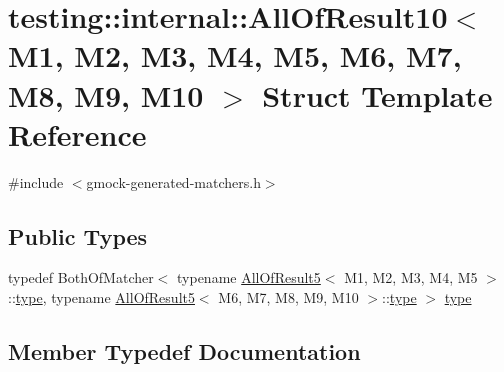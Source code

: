 \hypertarget{structtesting_1_1internal_1_1AllOfResult10}{}\section{testing\+::internal\+::All\+Of\+Result10$<$ M1, M2, M3, M4, M5, M6, M7, M8, M9, M10 $>$ Struct Template Reference}
\label{structtesting_1_1internal_1_1AllOfResult10}


{\ttfamily \#include $<$gmock-\/generated-\/matchers.\+h$>$}

\subsection*{Public Types}
\begin{DoxyCompactItemize}
\item 
typedef Both\+Of\+Matcher$<$ typename \mbox{\hyperlink{structtesting_1_1internal_1_1AllOfResult5}{All\+Of\+Result5}}$<$ M1, M2, M3, M4, M5 $>$\+::\mbox{\hyperlink{structtesting_1_1internal_1_1AllOfResult10_a48d6c6de6d0d5445b212119e1f536af5}{type}}, typename \mbox{\hyperlink{structtesting_1_1internal_1_1AllOfResult5}{All\+Of\+Result5}}$<$ M6, M7, M8, M9, M10 $>$\+::\mbox{\hyperlink{structtesting_1_1internal_1_1AllOfResult10_a48d6c6de6d0d5445b212119e1f536af5}{type}} $>$ \mbox{\hyperlink{structtesting_1_1internal_1_1AllOfResult10_a48d6c6de6d0d5445b212119e1f536af5}{type}}
\end{DoxyCompactItemize}


\subsection{Member Typedef Documentation}
\mbox{\label{structtesting_1_1internal_1_1AllOfResult10_a48d6c6de6d0d5445b212119e1f536af5}} 
